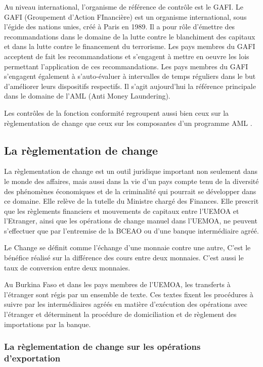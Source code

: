 Au niveau international, l'organisme de référence de contrôle est le GAFI.
Le GAFI (Groupement d'Action FInancière) est un organisme international, sous
l'égide des nations unies, créé à Paris en  1989. Il a pour rôle d'émettre des
recommandations dans le domaine de la lutte contre le blanchiment des capitaux
et dans la lutte contre le financement du terrorisme. Les pays membres du GAFI
acceptent de fait les recommandations et s'engagent à mettre en oeuvre les lois
permettant l'application de ces recommandations. Les pays membres du GAFI
s'engagent également à s'auto-évaluer à intervalles de temps réguliers dans le
but d'améliorer leurs dispositifs respectifs.
Il s'agit aujourd'hui la référence principale dans le domaine de l'AML (Anti
Money Laundering).

Les contrôles de la fonction conformité regroupent aussi bien ceux sur la
règlementation de change que ceux sur les composantes d'un programme AML
.

\subsection{ La règlementation de change} 

La règlementation de change est un outil juridique important non seulement
dans le monde des affaires, mais aussi dans la vie d’un pays compte tenu de
la diversité des phénomènes économiques et de la criminalité qui pourrait
se développer dans ce domaine. Elle relève de la tutelle du Ministre chargé
des Finances. Elle prescrit que les règlements financiers et mouvements de 
capitaux entre l'UEMOA et l'Etranger, ainsi que les opérations de change manuel
dans l'UEMOA, ne peuvent s'effectuer que par l'entremise de la BCEAO ou d'une 
banque intermédiaire agréé\cite{reglementfin}.

Le Change se définit comme l’échange d’une monnaie contre une autre, C’est le 
bénéfice réalisé sur la différence des cours entre deux monnaies. C’est aussi 
le taux de conversion entre deux monnaies.

Au Burkina Faso et dans les pays membres de l’UEMOA, les transferts à 
l’étranger sont régis par un ensemble de texte. Ces textes fixent les 
procédures à suivre par les intermédiaires agréés en matière d’exécution des
opérations avec l’étranger et déterminent la procédure de domiciliation et de 
règlement des importations par la banque.

\subsubsection{La règlementation de change sur les opérations d'exportation}

